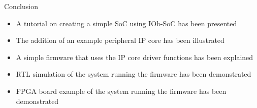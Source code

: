 \documentclass [xcolor=svgnames, t] {beamer}
\begin{document}
\begin{frame}{Conclusion}
  \begin{itemize}
  \item A tutorial on creating a simple SoC using IOb-SoC has been presented
  \item The addition of an example peripheral IP core has been illustrated
  \item A simple firmware that uses the IP core driver functions has been explained
  \item RTL simulation of the system running the firmware has been demonstrated
  \item FPGA board example of the system running the firmware has been demonstrated
  \end{itemize}
\end{frame}

\end{document}
